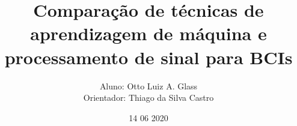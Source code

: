 \documentclass{beamer}
\title{Compara\c{c}\~ao de t\'ecnicas de \\aprendizagem de m\'aquina e\\ processamento de sinal para BCIs}
\author{Aluno: Otto Luiz A. Glass \\ Orientador: Thiago da Silva Castro}
\institute{Instituto Federal Sudeste MG \\ Campus Juiz de Fora}
\date{14 06 2020}
\begin{document}

\begin{frame}
	\maketitle %
\end{frame}


\end{document}

